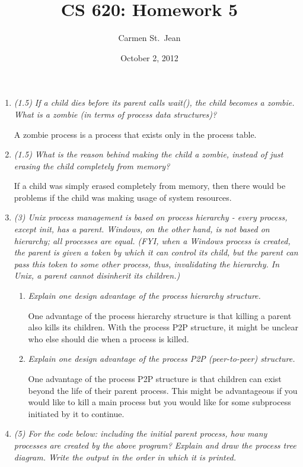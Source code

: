 \documentclass[letterpaper,11pt]{article}
\begin{document}
\title{CS 620: Homework 5}
\date{October 2, 2012}
\author{Carmen St.\ Jean}

\maketitle

\begin{enumerate}
\item \emph{(1.5) If a child dies before its parent calls \emph{wait()}, the child becomes a zombie. What is a zombie (in terms of process data structures)?}

A zombie process is a process that exists only in the process table.
\item \emph{(1.5) What is the reason behind making the child a zombie, instead of just erasing the child completely from memory?}

If a child was simply erased completely from memory, then there would be problems if the child was making usage of system resources.
\item \emph{(3) Unix process management is based on process hierarchy - every process, except init, has a parent. Windows, on the other hand, is not based on hierarchy; all processes are equal. (FYI, when a Windows process is created, the parent is given a token by which it can
control its child, but the parent can pass this token to some other process, thus, invalidating the hierarchy. In Unix, a parent cannot disinherit its children.)}

\begin{enumerate}
\item \emph{Explain one design advantage of the process hierarchy structure.}

One advantage of the process hierarchy structure is that killing a parent also kills its children.  With the process P2P structure, it might be unclear who else should die when a process is killed.
\item \emph{Explain one design advantage of the process P2P (peer-to-peer) structure.}

One advantage of the process P2P structure is that children can exist beyond the life of their parent process.  This might be advantageous if you would like to kill a main process but you would like for some subprocess initiated by it to continue.
\end{enumerate}
\item \emph{(5) For the code below: including the initial parent process, how many processes are created by the above program? Explain and draw the process tree diagram. Write the output in the order in which it is printed.}


\end{enumerate}
\end{document}
